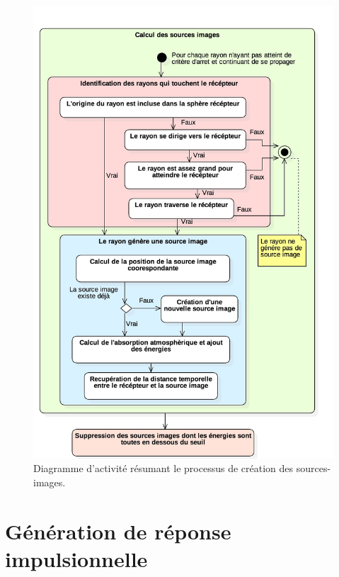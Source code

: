 \begin{figure}[h]
\centering
	\includegraphics[width=0.9\linewidth]{images/DiagSi}
	\caption{Diagramme d'activité résumant le processus de création des sources-images.}
	\label{DiagSi}
\end{figure}
%

\section{Génération de réponse impulsionnelle} \label{sect_rir}

